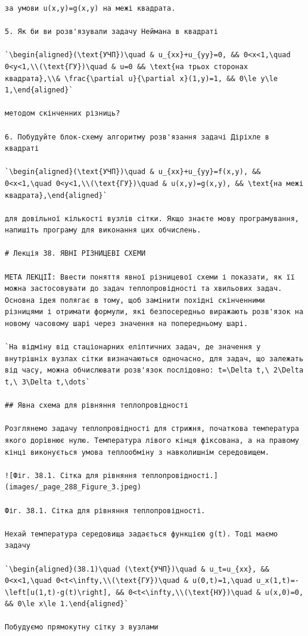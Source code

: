 \documentclass[
  ukrainian,
]{article}
\begin{document}
\begin{verbatim}
за умови u(x,y)=g(x,y) на межі квадрата.

5. Як би ви розв'язували задачу Неймана в квадраті

`\begin{aligned}(\text{УЧП})\quad & u_{xx}+u_{yy}=0, && 0<x<1,\quad 0<y<1,\\(\text{ГУ})\quad & u=0 && \text{на трьох сторонах квадрата},\\& \frac{\partial u}{\partial x}(1,y)=1, && 0\le y\le 1,\end{aligned}`

методом скінченних різниць?

6. Побудуйте блок-схему алгоритму розв'язання задачі Діріхле в квадраті

`\begin{aligned}(\text{УЧП})\quad & u_{xx}+u_{yy}=f(x,y), && 0<x<1,\quad 0<y<1,\\(\text{ГУ})\quad & u(x,y)=g(x,y), && \text{на межі квадрата},\end{aligned}`

для довільної кількості вузлів сітки. Якщо знаєте мову програмування, напишіть програму для виконання цих обчислень.

# Лекція 38. ЯВНІ РІЗНИЦЕВІ СХЕМИ

МЕТА ЛЕКЦІЇ: Ввести поняття явної різницевої схеми і показати, як її можна застосовувати до задач теплопровідності та хвильових задач. Основна ідея полягає в тому, щоб замінити похідні скінченними різницями і отримати формули, які безпосередньо виражають розв'язок на новому часовому шарі через значення на попередньому шарі.

`На відміну від стаціонарних еліптичних задач, де значення у внутрішніх вузлах сітки визначаються одночасно, для задач, що залежать від часу, можна обчислювати розв'язок послідовно: t=\Delta t,\ 2\Delta t,\ 3\Delta t,\dots`

## Явна схема для рівняння теплопровідності

Розглянемо задачу теплопровідності для стрижня, початкова температура якого дорівнює нулю. Температура лівого кінця фіксована, а на правому кінці виконується умова теплообміну з навколишнім середовищем.

![Фіг. 38.1. Сітка для рівняння теплопровідності.](images/_page_288_Figure_3.jpeg)

Фіг. 38.1. Сітка для рівняння теплопровідності.

Нехай температура середовища задається функцією g(t). Тоді маємо задачу

`\begin{aligned}(38.1)\quad (\text{УЧП})\quad & u_t=u_{xx}, && 0<x<1,\quad 0<t<\infty,\\(\text{ГУ})\quad & u(0,t)=1,\quad u_x(1,t)=-\left[u(1,t)-g(t)\right], && 0<t<\infty,\\(\text{НУ})\quad & u(x,0)=0, && 0\le x\le 1.\end{aligned}`

Побудуємо прямокутну сітку з вузлами
\end{verbatim}
\end{document}
